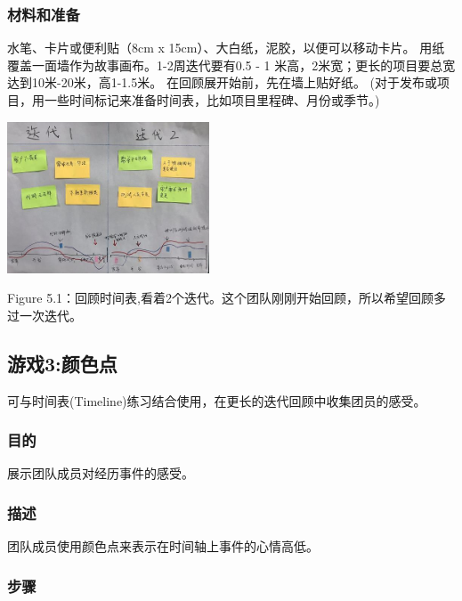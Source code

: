 \hypertarget{ux6750ux6599ux548cux51c6ux5907-1}{%
\subsubsection{材料和准备}\label{ux6750ux6599ux548cux51c6ux5907-1}}

水笔、卡片或便利贴（8cm x 15cm）、大白纸，泥胶，以便可以移动卡片。
用纸覆盖一面墙作为故事画布。1-2周迭代要有0.5 - 1
米高，2米宽；更长的项目要总宽达到10米-20米，高1-1.5米。
在回顾展开始前，先在墙上贴好纸。
(对于发布或项目，用一些时间标记来准备时间表，比如项目里程碑、月份或季节。)


\includegraphics[width=6cm]{Timeline20.jpg}

Figure
5.1：回顾时间表,看着2个迭代。这个团队刚刚开始回顾，所以希望回顾多过一次迭代。

\hypertarget{ux6e38ux620f3ux989cux8272ux70b9}{%
\subsection{游戏3:颜色点}\label{ux6e38ux620f3ux989cux8272ux70b9}}

可与时间表(Timeline)练习结合使用，在更长的迭代回顾中收集团员的感受。

\hypertarget{ux76eeux7684-2}{%
\subsubsection{目的}\label{ux76eeux7684-2}}

展示团队成员对经历事件的感受。

\hypertarget{ux63cfux8ff0-2}{%
\subsubsection{描述}\label{ux63cfux8ff0-2}}

团队成员使用颜色点来表示在时间轴上事件的心情高低。

\hypertarget{ux6b65ux9aa4-2}{%
\subsubsection{步骤}\label{ux6b65ux9aa4-2}}

